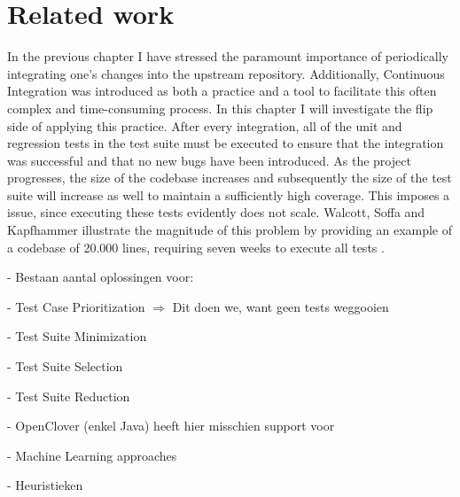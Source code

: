 \chapter{Related work}
In the previous chapter I have stressed the paramount importance of periodically integrating one's changes into the upstream repository. Additionally, Continuous Integration was introduced as both a practice and a tool to facilitate this often complex and time-consuming process. In this chapter I will investigate the flip side of applying this practice. After every integration, all of the unit and regression tests in the test suite must be executed to ensure that the integration was successful and that no new bugs have been introduced. As the project progresses, the size of the codebase increases and subsequently the size of the test suite will increase as well to maintain a sufficiently high coverage. This imposes a issue, since executing these tests evidently does not scale. Walcott, Soffa and Kapfhammer illustrate the magnitude of this problem by providing an example of a codebase of 20.000 lines, requiring seven weeks to execute all tests \cite{10.1145/1146238.1146240}.

- Bestaan aantal oplossingen voor:

  - Test Case Prioritization $\Rightarrow$ Dit doen we, want geen tests weggooien

- Test Suite Minimization

- Test Suite Selection

- Test Suite Reduction

- OpenClover (enkel Java) heeft hier misschien support voor

- Machine Learning approaches

- Heuristieken